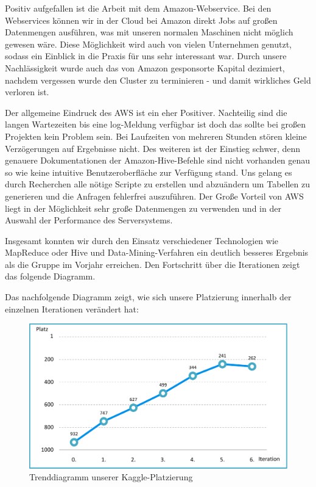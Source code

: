 Positiv aufgefallen ist die Arbeit mit dem Amazon-Webservice. Bei den Webservices können wir in der Cloud bei Amazon direkt Jobs auf großen Datenmengen ausführen, was mit unseren normalen Maschinen nicht möglich gewesen wäre. Diese Möglichkeit wird auch von vielen Unternehmen genutzt, sodass ein Einblick in die Praxis für uns sehr interessant war. Durch unsere Nachlässigkeit wurde auch das von Amazon gesponsorte Kapital dezimiert, nachdem vergessen wurde den Cluster zu terminieren - und damit wirkliches Geld verloren ist.


Der allgemeine Eindruck des AWS ist ein eher Positiver. Nachteilig sind die langen Wartezeiten bis eine log-Meldung verfügbar ist doch das sollte bei großen Projekten kein Problem sein. Bei Laufzeiten von mehreren Stunden stören kleine Verzögerungen auf Ergebnisse nicht. Des weiteren ist der Einstieg schwer, denn genauere Dokumentationen der Amazon-Hive-Befehle sind nicht vorhanden genau so wie keine intuitive Benutzeroberfläche zur Verfügung stand. Uns gelang es durch Recherchen alle nötige Scripte zu erstellen und abzuändern um Tabellen zu generieren und die Anfragen fehlerfrei auszuführen. Der Große Vorteil von AWS liegt in der Möglichkeit sehr große Datenmengen zu verwenden und in der  Auswahl der Performance des Serversystems. 
 


Insgesamt konnten wir durch den Einsatz verschiedener Technologien wie MapReduce oder Hive und Data-Mining-Verfahren ein deutlich besseres Ergebnis als die Gruppe im Vorjahr erreichen. Den Fortschritt über die Iterationen zeigt das folgende Diagramm.

Das nachfolgende Diagramm zeigt, wie sich unsere Platzierung innerhalb der einzelnen Iterationen verändert hat:

\begin{figure}[H]
\centering
\includegraphics[width=0.85\linewidth]{Bilder/Trenddiagramm_Platzierungen}
\caption{Trenddiagramm unserer Kaggle-Platzierung}
\label{fig:Trenddiagramm_Platzierungen}
\end{figure}

